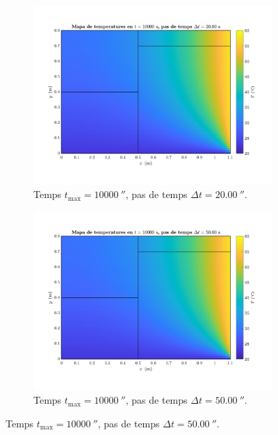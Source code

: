 \begin{figure}[ht]
\begin{subfigure}{.5\textwidth}
		\label{fig:pas_temps_16}
	\end{subfigure}
	\begin{subfigure}{.5\textwidth}
		\centering
		\includegraphics[width=.95\linewidth]{imagenes/04_analisi_influencia_dades_numeriques/pas_temps/pas_temps_17.pdf}
		\vspace{-15pt}
		\caption{Temps $t_\text{max} = 10000 \ \second$, pas de temps $\Delta t = 20.00 \ \second$.}
		\label{fig:pas_temps_17}
	\end{subfigure}%
	\begin{subfigure}{.5\textwidth}
		\centering
		\includegraphics[width=.95\linewidth]{imagenes/04_analisi_influencia_dades_numeriques/pas_temps/pas_temps_18.pdf}
		\vspace{-15pt}
		\caption{Temps $t_\text{max} = 10000 \ \second$, pas de temps $\Delta t = 50.00 \ \second$.}

\end{subfigure}
\end{figure}
